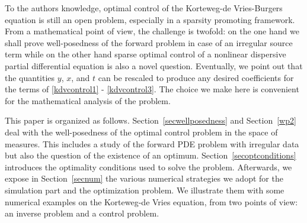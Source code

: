 To the authors knowledge, optimal control of the Korteweg-de Vries-Burgers equation is still an open problem, especially in a sparsity promoting framework. From a mathematical point of view, the challenge is twofold: on the one hand we shall prove well-posedness of the forward problem in case of an irregular source term while on the other hand sparse optimal control of a nonlinear dispersive partial differential equation is also a novel question. Eventually, we point out that the quantities $y$, $x$, and $t$ can be rescaled to produce any desired coefficients for the terms of \eqref{kdvcontrol1} - \eqref{kdvcontrol3}. The choice we make here is convenient for the mathematical analysis of the problem.

This paper is organized as follows. Section~\ref{secwellposedness} and Section~\ref{wp2} deal with the well-posedness of the optimal control problem in the space of measures. This includes a study of the forward PDE problem with irregular data but also the question of the existence of an optimum. Section~\ref{secoptconditions} introduces the optimality conditions used to solve the problem. Afterwards, we expose in Section~\ref{secnum} the various numerical strategies we adopt for the simulation part and the optimization problem. We illustrate them with some numerical examples on the Korteweg-de Vries equation, from two points of view: an inverse problem and a control problem.

